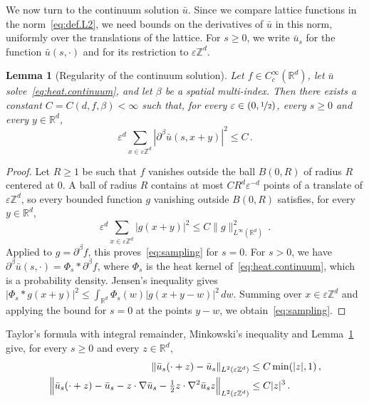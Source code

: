 \documentclass[11pt]{amsart}
\newtheorem{lemma}[theorem]{Lemma}
\numberwithin{equation}{section}
\newcommand{\Z}{\mathbb{Z}}
\newcommand{\R}{\mathbb{R}}
\newcommand{\eps}{\varepsilon}
\newcommand{\nf}{\nicefrac}
\begin{document}
We now turn to the continuum solution $\bar u$.
Since we compare lattice functions in the norm~\eqref{eq:def.L2}, we need bounds on the derivatives of $\bar u$ in this norm, uniformly over the translations of the lattice.
For $s \geq 0$, we write $\bar u_s$ for the function $\bar u(s, \cdot)$ and for its restriction to $\eps \Z^d$.

\begin{lemma}[Regularity of the continuum solution] \label{lem:sampling}
Let $f \in C^\infty_c(\R^d)$, let $\bar u$ solve~\eqref{eq:heat.continuum}, and let $\beta$ be a spatial multi-index.
Then there exists a constant $C = C(d, f, \beta) < \infty$ such that, for every $\eps \in (0, \nf12)$, every $s \geq 0$ and every $y \in \R^d$,
\begin{equation} \label{eq:sampling}
    \eps^d \sum_{x \in \eps \Z^d} |\partial^\beta \bar u(s, x + y)|^2 \leq C\,.
\end{equation}
\end{lemma}

\begin{proof}
Let $R \geq 1$ be such that $f$ vanishes outside the ball $B(0,R)$ of radius $R$ centered at $0$.
A ball of radius $R$ contains at most $C R^d \eps^{-d}$ points of a translate of $\eps \Z^d$, so every bounded function $g$ vanishing outside $B(0,R)$ satisfies, for every $y \in \R^d$,
\begin{equation*}
    \eps^d \sum_{x \in \eps \Z^d} |g(x + y)|^2 \leq C \|g\|_{L^\infty(\R^d)}^2\,.
\end{equation*}
Applied to $g = \partial^\beta f$, this proves~\eqref{eq:sampling} for $s = 0$.
For $s > 0$, we have $\partial^\beta \bar u(s, \cdot) = \Phi_s * \partial^\beta f$, where $\Phi_s$ is the heat kernel of~\eqref{eq:heat.continuum}, which is a probability density.
Jensen's inequality gives $|\Phi_s * g(x + y)|^2 \leq \int_{\R^d} \Phi_s(w) |g(x + y - w)|^2 \,dw$.
Summing over $x \in \eps \Z^d$ and applying the bound for $s = 0$ at the points $y - w$, we obtain~\eqref{eq:sampling}.
\end{proof}

Taylor's formula with integral remainder, Minkowski's inequality and Lemma~\ref{lem:sampling} give, for every $s \geq 0$ and every $z \in \R^d$,
\begin{align}
    \|\bar u_s(\cdot + z) - \bar u_s\|_{L^2(\eps \Z^d)} &\leq C \min(|z|, 1)\,, \label{eq:increment} \\
    \Bigl\| \bar u_s(\cdot + z) - \bar u_s - z \cdot \nabla \bar u_s - \tfrac12 z \cdot \nabla^2 \bar u_s z \Bigr\|_{L^2(\eps \Z^d)} &\leq C |z|^3\,. \label{eq:taylor}
\end{align}
\end{document}
